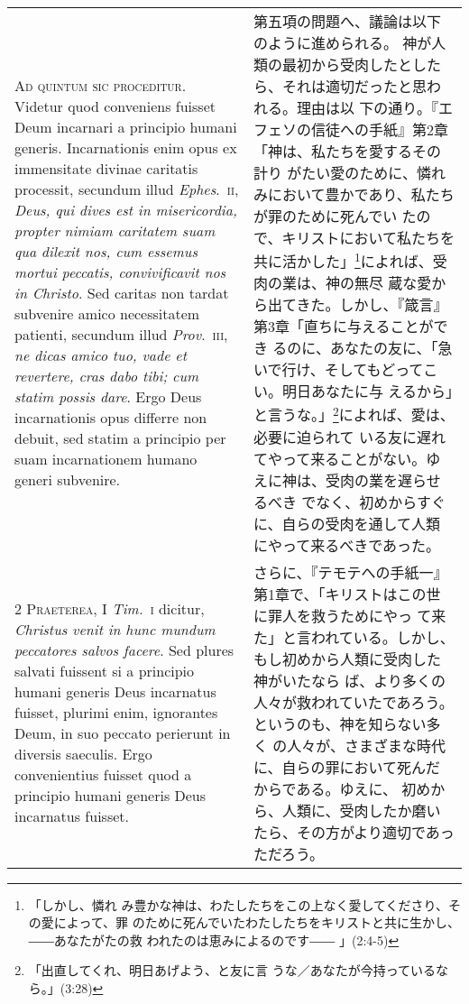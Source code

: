 \documentclass[10pt]{jsarticle} %
\begin{document}
\begin{longtable}{p{21em}p{21em}}


{\Huge A}{\scshape d quintum sic proceditur}. Videtur quod
conveniens fuisset Deum incarnari a principio humani
generis. Incarnationis enim opus ex immensitate divinae caritatis
processit, secundum illud {\itshape Ephes}.~{\scshape ii}, {\itshape Deus, qui dives est in
misericordia, propter nimiam caritatem suam qua dilexit nos, cum essemus
mortui peccatis, convivificavit nos in Christo}. Sed caritas non tardat
subvenire amico necessitatem patienti, secundum illud {\itshape Prov}.~{\scshape iii}, {\itshape ne
dicas amico tuo, vade et revertere, cras dabo tibi; cum statim possis
dare}. Ergo Deus incarnationis opus differre non debuit, sed statim a
principio per suam incarnationem humano generi subvenire.


&

第五項の問題へ、議論は以下のように進められる。
神が人類の最初から受肉したとしたら、それは適切だったと思われる。理由は以
 下の通り。『エフェソの信徒への手紙』第2章「神は、私たちを愛するその計り
 がたい愛のために、憐れみにおいて豊かであり、私たちが罪のために死んでい
 たので、キリストにおいて私たちを共に活かした」\footnote{「しかし、憐れ
 み豊かな神は、わたしたちをこの上なく愛してくださり、その愛によって、罪
 のために死んでいたわたしたちをキリストと共に生かし、――あなたがたの救
 われたのは恵みによるのです―― 」(2:4-5)}によれば、受肉の業は、神の無尽
 蔵な愛から出てきた。しかし、『箴言』第3章「直ちに与えることができ
 るのに、あなたの友に、「急いで行け、そしてもどってこい。明日あなたに与
 えるから」と言うな。」\footnote{「出直してくれ、明日あげよう、と友に言
 うな／あなたが今持っているなら。」(3:28)}によれば、愛は、必要に迫られて
 いる友に遅れてやって来ることがない。ゆえに神は、受肉の業を遅らせるべき
 でなく、初めからすぐに、自らの受肉を通して人類にやって来るべきであった。


\\


2 {\scshape Praeterea}, I {\itshape Tim.}~{\scshape i} dicitur, {\itshape Christus
venit in hunc mundum peccatores salvos facere}. Sed plures salvati
fuissent si a principio humani generis Deus incarnatus fuisset, plurimi
enim, ignorantes Deum, in suo peccato perierunt in diversis
saeculis. Ergo convenientius fuisset quod a principio humani generis
Deus incarnatus fuisset.


&

さらに、『テモテへの手紙一』第1章で、「キリストはこの世に罪人を救うためにやっ
 て来た」と言われている。しかし、もし初めから人類に受肉した神がいたなら
 ば、より多くの人々が救われていたであろう。というのも、神を知らない多く
 の人々が、さまざまな時代に、自らの罪において死んだからである。ゆえに、
 初めから、人類に、受肉したか磨いたら、その方がより適切であっただろう。


\end{longtable}
\end{document}
